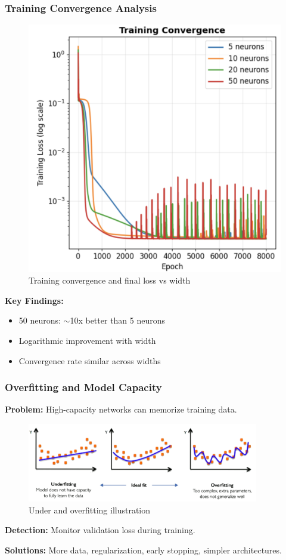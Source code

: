 \documentclass[notes]{beamer}
\begin{document}
\begin{frame}
\frametitle{Training Convergence Analysis}
\begin{minipage}[t]{0.58\textwidth}
\begin{figure}[ht]
	\centering
	\includegraphics[width=0.65\linewidth]{figs/training-convergence.png}
	\caption*{Training convergence and final loss vs width}
\end{figure}
\end{minipage}
\hfill
\begin{minipage}[t]{0.38\textwidth}
\textbf{Key Findings:}
\begin{itemize}
\item 50 neurons: $\sim$10x better than 5 neurons
\item Logarithmic improvement with width
\item Convergence rate similar across widths
\end{itemize}

\end{minipage}

\end{frame}

\begin{frame}
\frametitle{Overfitting and Model Capacity}

\textbf{Problem:} High-capacity networks can memorize training data.

\begin{figure}[ht]
	\centering
	\includegraphics[width=0.9\textwidth]{figs/overfitting.png}
	\caption*{Under and overfitting illustration}
\end{figure}

\textbf{Detection:} Monitor validation loss during training.

\textbf{Solutions:} More data, regularization, early stopping, simpler architectures.

\end{frame}
\end{document}
